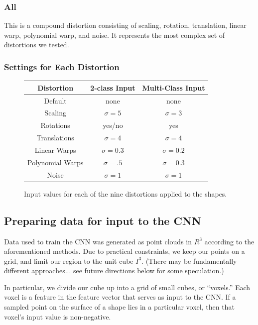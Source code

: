 \documentclass{article}
\begin{document}
\subsubsection{All}
This is a compound distortion consisting of scaling, rotation, translation, linear warp,
polynomial warp, and noise. It represents the most complex set of distortions we tested.

\subsubsection{Settings for Each Distortion}
\begin{figure}
\begin{center}
 \begin{tabular}{|c|c|c|}
 \hline
  Distortion  & 2-class Input &  Multi-Class Input   \\ [0.5ex]
 \hline

 Default & none & none\\
 \hline
  Scaling & $\sigma=5$ & $\sigma=3$\\
 \hline
  Rotations & yes/no & yes\\
 \hline
  Translations &  $\sigma=4$& $\sigma=4$\\
 \hline
  Linear Warps & $\sigma=0.3$& $\sigma=0.2$\\
 \hline
  Polynomial Warps & $\sigma=.5$ & $\sigma=0.3$\\

 \hline
  Noise & $\sigma=1$ & $\sigma=1$ \\  [1ex]
 \hline
\end{tabular}
\end{center}
\caption{Input values for each of the nine distortions applied to the shapes.}
\label{distortion-settings}
\end{figure}


\subsection{Preparing data for input to the CNN}

Data used to train the CNN was generated as point clouds in $R^3$ according to the aforementioned methods.
Due to practical constraints, we keep our points on a grid, and limit our region to the unit cube $I^3$.
(There may be fundamentally different approaches... see future directions below for some speculation.)

In particular, we divide our cube up into a grid of small cubes, or ``voxels.''
Each voxel is a feature in the feature vector that serves as input to the CNN.
If a sampled point on the surface of a shape lies in a particular voxel,
then that voxel's input value is non-negative.
\end{document}
